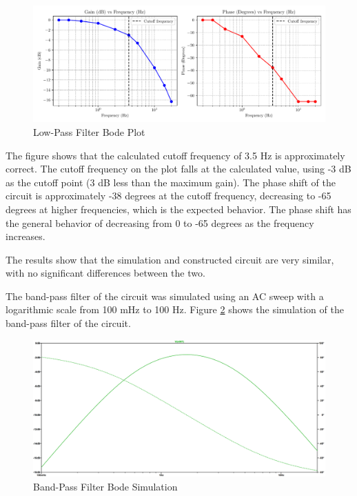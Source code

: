 \documentclass[CMPE]{KGCOEReport}
\begin{document}
\begin{figure}[H]
    \centering
    \includegraphics[width=1\textwidth]{low_pass_plot.pdf}
    \caption{Low-Pass Filter Bode Plot}
    \label{fig:lowPassBode}
\end{figure}

The figure shows that the calculated cutoff frequency of 3.5 Hz is approximately correct. The cutoff frequency on the plot falls at the calculated value, using -3 dB as the cutoff point (3 dB less than the maximum gain). The phase shift of the circuit is approximately -38 degrees at the cutoff frequency, decreasing to -65 degrees at higher frequencies, which is the expected behavior. The phase shift has the general behavior of decreasing from 0 to -65 degrees as the frequency increases.

The results show that the simulation and constructed circuit are very similar, with no significant differences between the two.

\bigskip

The band-pass filter of the circuit was simulated using an AC sweep with a logarithmic scale from 100 mHz to 100 Hz. Figure \ref{fig:bandPassSim} shows the simulation of the band-pass filter of the circuit.

\begin{figure}[H]
    \centering
    \includegraphics[width=1\textwidth]{SimFreqBandPass.png}
    \caption{Band-Pass Filter Bode Simulation}
    \label{fig:bandPassSim}
\end{figure}
\end{document}

